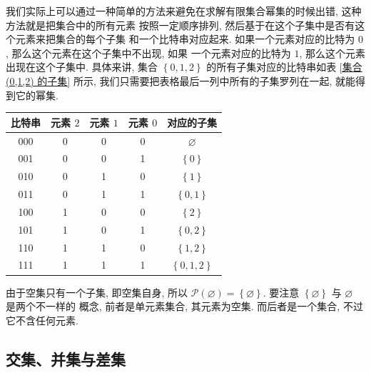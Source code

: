 \documentclass[10pt,UTF8]{book} %
\begin{document}
我们实际上可以通过一种简单的方法来避免在求解有限集合幂集的时候出错, 这种方法就是把集合中的所有元素
按照一定顺序排列, 然后基于在这个子集中是否有这个元素来把集合的每个子集
和一个比特串对应起来. 如果一个元素对应的比特为 $0$, 那么这个元素在这个子集中不出现, 如果
一个元素对应的比特为 $1$, 那么这个元素出现在这个子集中. 具体来讲, 集合 $\left\{0,1,2\right\}$
的所有子集对应的比特串如表 \ref{集合 (0,1,2) 的子集} 所示, 我们只需要把表格最后一列中所有的子集罗列在一起,
就能得到它的幂集.
{ %
\label{集合 (0,1,2) 的子集}
\begin{longtable}{c|ccc|c}
    \toprule
    \textbf{比特串} & \textbf{元素} $2$ & \textbf{元素} $1$ & \textbf{元素} $0$ & \textbf{对应的子集} \\
    \midrule
    \endhead
    \bottomrule
    \endfoot

    000 & 0 & 0 & 0 & $\varnothing$ \\ 
    001 & 0 & 0 & 1 & $\left\{ 0 \right\}$ \\
    010 & 0 & 1 & 0 & $\left\{ 1 \right\}$ \\ 
    011 & 0 & 1 & 1 & $\left\{ 0, 1 \right\}$ \\ 
    100 & 1 & 0 & 0 & $\left\{ 2 \right\}$ \\ 
    101 & 1 & 0 & 1 & $\left\{ 0, 2 \right\}$ \\ 
    110 & 1 & 1 & 0 & $\left\{ 1,2 \right\}$ \\ 
    111 & 1 & 1 & 1 & $\left\{ 0, 1, 2 \right\}$ \\
\end{longtable}}

\begin{example}
    由于空集只有一个子集, 即空集自身, 所以 $\mathcal{P}(\varnothing) = \left\{
        \varnothing
    \right\}$. 要注意 $\left\{ \varnothing \right\}$ 与 $\varnothing$ 是两个不一样的
    概念, 前者是单元素集合, 其元素为空集. 而后者是一个集合, 不过它不含任何元素.
\end{example}

\subsection{交集、并集与差集}
\end{document}
